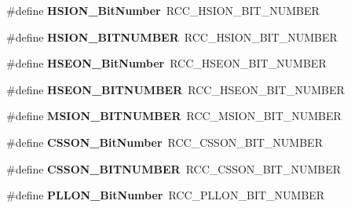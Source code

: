 \begin{DoxyCompactItemize}
\item 
\mbox{\label{group___h_a_l___r_c_c___aliased_ga3d3085e491cbef815d223afbe5bf1930}} 
\#define {\bfseries H\+S\+I\+O\+N\+\_\+\+Bit\+Number}~R\+C\+C\+\_\+\+H\+S\+I\+O\+N\+\_\+\+B\+I\+T\+\_\+\+N\+U\+M\+B\+ER
\item 
\mbox{\label{group___h_a_l___r_c_c___aliased_ga79f147c8b2f8fe05574f861483be5aa4}} 
\#define {\bfseries H\+S\+I\+O\+N\+\_\+\+B\+I\+T\+N\+U\+M\+B\+ER}~R\+C\+C\+\_\+\+H\+S\+I\+O\+N\+\_\+\+B\+I\+T\+\_\+\+N\+U\+M\+B\+ER
\item 
\mbox{\label{group___h_a_l___r_c_c___aliased_ga7b52a4205001d305fb5ef1d6b5bfd2cd}} 
\#define {\bfseries H\+S\+E\+O\+N\+\_\+\+Bit\+Number}~R\+C\+C\+\_\+\+H\+S\+E\+O\+N\+\_\+\+B\+I\+T\+\_\+\+N\+U\+M\+B\+ER
\item 
\mbox{\label{group___h_a_l___r_c_c___aliased_ga6ca813609511152216b194e490bef027}} 
\#define {\bfseries H\+S\+E\+O\+N\+\_\+\+B\+I\+T\+N\+U\+M\+B\+ER}~R\+C\+C\+\_\+\+H\+S\+E\+O\+N\+\_\+\+B\+I\+T\+\_\+\+N\+U\+M\+B\+ER
\item 
\mbox{\label{group___h_a_l___r_c_c___aliased_ga269ef9e8d23c9ea0c0a0df0d361c3467}} 
\#define {\bfseries M\+S\+I\+O\+N\+\_\+\+B\+I\+T\+N\+U\+M\+B\+ER}~R\+C\+C\+\_\+\+M\+S\+I\+O\+N\+\_\+\+B\+I\+T\+\_\+\+N\+U\+M\+B\+ER
\item 
\mbox{\label{group___h_a_l___r_c_c___aliased_ga253fa44d87aabc55f0cd6628e77a51fd}} 
\#define {\bfseries C\+S\+S\+O\+N\+\_\+\+Bit\+Number}~R\+C\+C\+\_\+\+C\+S\+S\+O\+N\+\_\+\+B\+I\+T\+\_\+\+N\+U\+M\+B\+ER
\item 
\mbox{\label{group___h_a_l___r_c_c___aliased_ga993cf17c844a51d912cf099d4117bd70}} 
\#define {\bfseries C\+S\+S\+O\+N\+\_\+\+B\+I\+T\+N\+U\+M\+B\+ER}~R\+C\+C\+\_\+\+C\+S\+S\+O\+N\+\_\+\+B\+I\+T\+\_\+\+N\+U\+M\+B\+ER
\item 
\mbox{\label{group___h_a_l___r_c_c___aliased_gab24d7f5f8e4b3b717fd91b54f393f6a3}} 
\#define {\bfseries P\+L\+L\+O\+N\+\_\+\+Bit\+Number}~R\+C\+C\+\_\+\+P\+L\+L\+O\+N\+\_\+\+B\+I\+T\+\_\+\+N\+U\+M\+B\+ER

\end{DoxyCompactItemize}
